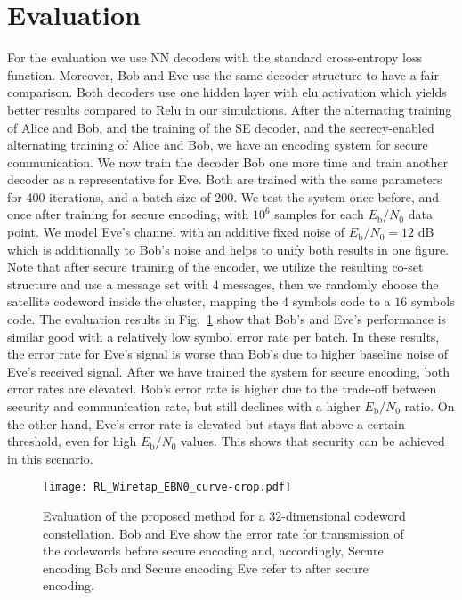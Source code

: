 \documentclass[conference, 10pt]{IEEEtran}
\begin{document}
\section{Evaluation}

For the evaluation we use NN decoders with the standard cross-entropy loss function. Moreover, Bob and Eve use the same decoder structure to have a fair comparison. Both decoders use one hidden layer with elu activation which yields better results compared to Relu in our simulations.
After the alternating training of Alice and Bob, and the training of the SE decoder, and the secrecy-enabled alternating training of Alice and Bob, we have an encoding system for secure communication. We now train the decoder Bob one more time and train another decoder as a representative for Eve. Both are trained with the same parameters for 400 iterations, and a batch size of 200. We test the system once before, and once after training for secure encoding, with $10^6$ samples for each $E_{\text{b}}/N_0$ data point. We model Eve's channel with an additive fixed noise of $E_{\text{b}}/N_0=12$ dB which is additionally to Bob's noise and helps to unify both results in one figure.
Note that after secure training of the encoder, we utilize the resulting co-set structure and use a message set with $4$ messages, then we randomly choose the satellite codeword inside the cluster, mapping the $4$ symbols code to a $16$ symbols code. The evaluation results in Fig.~\ref{fig:res} show that Bob's and Eve's performance is similar good with a relatively low symbol error rate per batch. In these results, the error rate for Eve's signal is worse than Bob's due to higher baseline noise of Eve's received signal. After we have trained the system for secure encoding, both error rates are elevated. Bob's error rate is higher due to the trade-off between security and communication rate, but still declines with a higher $E_{\text{b}}/N_0$ ratio. On the other hand, Eve's error rate is elevated but stays flat above a certain threshold, even for high $E_{\text{b}}/N_0$ values. This shows that security can be achieved in this scenario.

\begin{figure}
\vspace{0.5em}
\centering
\texttt{[image: RL\_Wiretap\_EBN0\_curve-crop.pdf]}
%
\caption{Evaluation of the proposed method for a $32$-dimensional codeword constellation. Bob and Eve show the error rate for transmission of the codewords before secure encoding and, accordingly, Secure encoding Bob and Secure encoding Eve refer to after secure encoding.}
\label{fig:res}
%
\end{figure}
\end{document}
